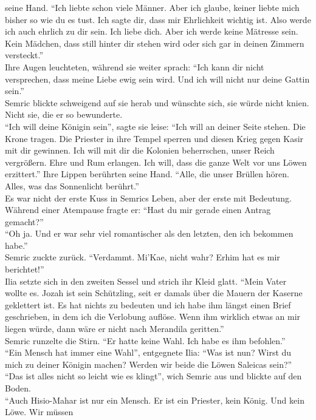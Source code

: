 seine Hand. ``Ich liebte schon viele Männer. Aber ich glaube, keiner liebte mich bisher so 
wie du es tust. Ich sagte dir, dass mir Ehrlichkeit wichtig ist. Also werde ich auch ehrlich zu dir 
sein. Ich liebe dich. Aber ich werde keine Mätresse sein. Kein Mädchen, dass still hinter dir 
stehen wird oder sich gar in deinen Zimmern versteckt.''\\
Ihre Augen leuchteten, während sie weiter sprach: ``Ich kann dir nicht versprechen, dass meine 
Liebe ewig sein wird. Und ich will nicht nur deine Gattin sein.''\\
Semric blickte schweigend auf sie herab und wünschte sich, sie würde nicht knien. Nicht sie, die er 
so bewunderte.\\
``Ich will deine Königin sein'', sagte sie leise: ``Ich will an deiner Seite stehen. Die Krone 
tragen. Die Priester in ihre Tempel sperren und diesen Krieg gegen Kasir mit dir gewinnen. Ich will 
mit dir die Kolonien beherrschen, unser Reich vergrößern. Ehre und Rum erlangen. Ich will, dass die 
ganze Welt vor uns Löwen erzittert.'' Ihre Lippen berührten seine Hand. ``Alle, die unser Brüllen 
hören. Alles, was das Sonnenlicht berührt.''\\
Es war nicht der erste Kuss in Semrics Leben, aber der erste mit Bedeutung. Während einer Atempause 
fragte er: ``Hast du mir gerade einen Antrag gemacht?''\\
``Oh ja. Und er war sehr viel romantischer als den letzten, den ich bekommen habe.''\\
Semric zuckte zurück. ``Verdammt. Mi'Kae, nicht wahr? Erhim hat es mir berichtet!''\\
Ilia setzte sich in den zweiten Sessel und strich ihr Kleid glatt. ``Mein Vater wollte es. Jozah 
ist sein Schützling, seit er damals über die Mauern der Kaserne geklettert ist. Es hat nichts zu 
bedeuten und ich habe ihm längst einen Brief geschrieben, in dem ich die Verlobung auflöse. Wenn 
ihm wirklich etwas an mir liegen würde, dann wäre er nicht nach Merandila geritten.''\\
Semric runzelte die Stirn. ``Er hatte keine Wahl. Ich habe es ihm befohlen.''\\
``Ein Mensch hat immer eine Wahl'', entgegnete Ilia: ``Was ist nun? Wirst du mich zu deiner Königin 
machen? Werden wir beide die Löwen Saleicas sein?''\\
``Das ist alles nicht so leicht wie es klingt'', wich Semric aus und blickte auf den Boden.\\
``Auch Hisio-Mahar ist nur ein Mensch. Er ist ein Priester, kein König. Und kein Löwe. Wir müssen 
